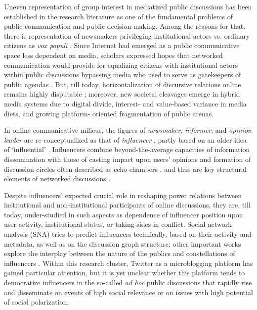 Uneven representation of group interest in mediatized public discussions has been established in the research literature \cite{Nieminen} as one of the fundamental problems of public communication and public decision-making. Among the reasons for that, there is representation of newsmakers privileging institutional actors vs. ordinary citizens as \textit{vox populi} \cite{ScheufeleTewksbury}. Since Internet had emerged as a public communicative space less dependent on media, scholars expressed hopes that networked communication would provide for equalizing citizens with institutional actors within public discussions \cite{White1997} bypassing media who used to serve as gatekeepers of public agendas \cite{White1950}. But, till today, horizontalization of discursive relations online remains highly disputable \cite{Fuchs}; moreover, new societal cleavages emerge in hybrid media systems \cite{Chadwick} due to digital divide, interest- and value-based variance in media diets, and growing platform- oriented fragmentation of public arenas.

In online communicative milieus, the figures of \textit{newsmaker}, \textit{informer}, and \textit{opinion leader} are re-conceptualized as that of \textit{influencer} \cite{PattersonGrennyMaxfield}, partly based on an older idea of ‘influential’ \cite{Rogers}. Influencers combine beyond-the-average capacities of information dissemination with those of casting impact upon users’ opinions and formation of discussion circles often described as echo chambers \cite{Wallsten}, and thus are key structural elements of networked discussions \cite{Castells2007,BakshyRosennMarlow}.

Despite influencers’ expected crucial role in reshaping power relations between institutional and non-institutional participants of online discussions, they are, till today, under-studied in such aspects as dependence of influencer position upon user activity, institutional status, or taking sides in conflict. Social network analysis (SNA) tries to predict influencers technically, based on their activity and metadata, as well as on the discussion graph structure; other important works explore the interplay between the nature of the publics and constellations of influencers \cite{Habermas,Dahlgren,BrunsBurgess,Papacharissi,BrunsHighfeld2016}. Within this research cluster, Twitter as a microblogging platform has gained particular attention, but it is yet unclear whether this platform tends to democratize influencers in the so-called \textit{ad hoc} public discussions that rapidly rise and disseminate on events of high social relevance or on issues with high potential of social polarization.


